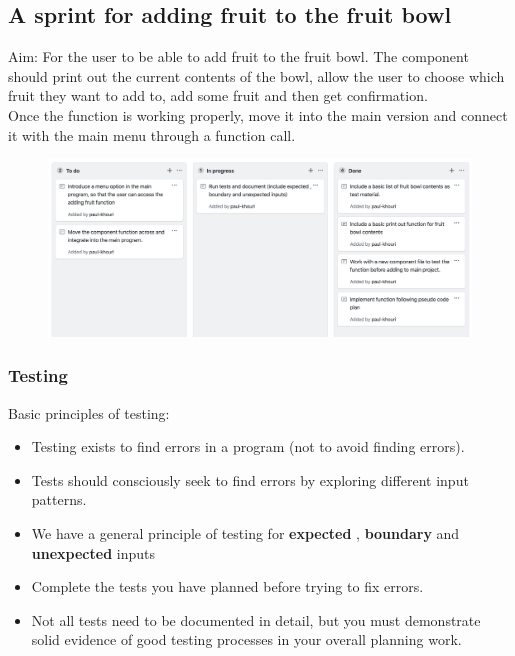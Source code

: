 \documentclass[a4paper,12pt]{article}
\begin{document}
\subsection{A sprint for adding fruit to the fruit bowl}
Aim: For the user to be able to add fruit to the fruit bowl. The component should print out the current contents of the bowl, allow the user to choose which fruit they want to add to, add some fruit and then get confirmation.\\
Once the function is working properly, move it into the main version and connect it with the main menu through a function call. 


\begin{figure}[!ht]
	\centering
	\includegraphics[width=14cm]{images/Adding_fruit_board.png}
\end{figure}
\subsubsection{Testing}
Basic principles of testing:
\begin{itemize}
	\item Testing exists to find errors in a program (not to avoid finding errors).
	\item Tests should consciously seek to find errors by exploring different input patterns.
	\item We have a general principle of testing for \textbf{expected} , \textbf{boundary} and \textbf{unexpected} inputs
	\item Complete the tests you have planned before trying to fix errors.
	\item Not all tests need to be documented in detail, but you must demonstrate solid evidence of good testing processes in your overall planning work.
\end{itemize}
\newpage
\end{document}
